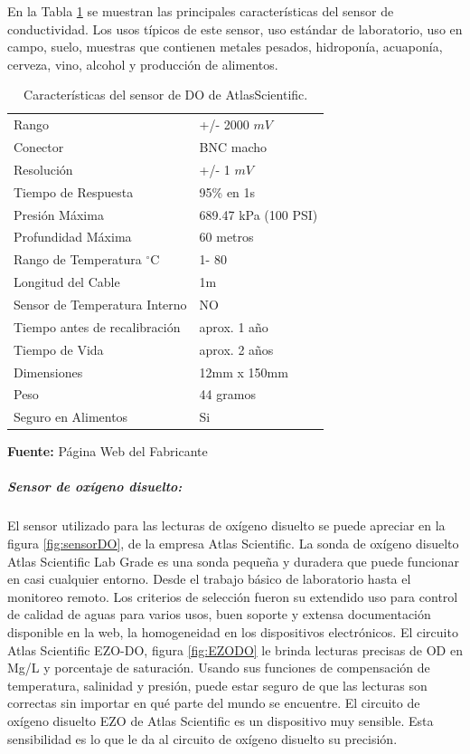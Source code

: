 En la Tabla \ref{tab:caract_OPR} se muestran las principales características del sensor de conductividad. Los usos típicos de este sensor, uso estándar de laboratorio, uso en campo, suelo, muestras que contienen metales pesados, hidroponía, acuaponía, cerveza, vino, alcohol y producción de alimentos.

\begin{table}[H]
\protect\caption[Características del sensor de DO de AtlasScientific]{Características del sensor de DO de AtlasScientific.}
\label{tab:caract_OPR}
\begin{center}
\begin{tabular}{l l}
\hline
Rango   &  +/- 2000     $mV$         \\
Conector &  BNC macho                       \\
Resolución   &  +/- 1 $ mV$              \\
Tiempo de Respuesta   &  95\% en 1s         \\
Presión Máxima    &  689.47 kPa (100 PSI)    \\
Profundidad Máxima	& 60 metros            \\
Rango de Temperatura $^{\circ}$C	& 1- 80\\
Longitud del Cable	& 1m                    \\
Sensor de Temperatura Interno	& NO        \\
Tiempo antes de recalibración	& aprox. 1 año    \\
Tiempo de Vida	& aprox. 2 años            \\
Dimensiones	& 12mm x 150mm                  \\
Peso	& 44 gramos                         \\
Seguro en Alimentos	& Si                    \\
\hline
\end{tabular}
\vspace{5mm}
\newline
\hfill \textbf{Fuente:} P\'agina Web del Fabricante \cite{orp_sensor_measure_nodate}
\end{center}
\end{table}

\subparagraph{Sensor de ox\'igeno disuelto:}
El sensor utilizado para las lecturas de ox\'igeno disuelto se puede apreciar en la figura \ref{fig:sensorDO}, de la empresa Atlas Scientific. La sonda de oxígeno disuelto Atlas Scientific Lab Grade es una sonda pequeña y duradera que puede funcionar en casi cualquier entorno. Desde el trabajo básico de laboratorio hasta el monitoreo remoto. Los criterios de selección fueron su extendido uso para control de calidad de aguas para varios usos, buen soporte y extensa documentación disponible en la web, la homogeneidad en los dispositivos electrónicos. 
El circuito Atlas Scientific EZO-DO, figura \ref{fig:EZODO} le brinda lecturas precisas de OD en Mg/L y porcentaje de saturación. Usando sus funciones de compensación de temperatura, salinidad y presión, puede estar seguro de que las lecturas son correctas sin importar en qué parte del mundo se encuentre. El circuito de oxígeno disuelto EZO de Atlas Scientific es un dispositivo muy sensible. Esta sensibilidad es lo que le da al circuito de oxígeno disuelto su precisión. 


